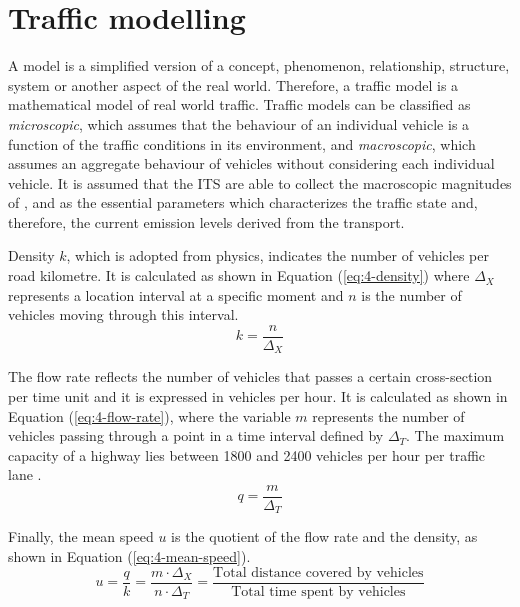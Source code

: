 \section{Traffic modelling}
A model is a simplified version of a concept, phenomenon, relationship, structure, system or another aspect of the real world. Therefore, a traffic model is a mathematical model of real world traffic. Traffic models can be classified as \textit{microscopic}, which assumes that the behaviour of an individual vehicle is a function of the traffic conditions in its environment, and \textit{macroscopic}, which assumes an aggregate behaviour of vehicles without considering each individual vehicle. It is assumed that the \ac{ITS} are able to collect the macroscopic magnitudes of ,  and  as the essential parameters which characterizes the traffic state and, therefore, the current emission levels derived from the transport.

Density $k$, which is adopted from physics, indicates the number of vehicles per road kilometre. It is calculated as shown in Equation (\ref{eq:4-density}) where ${ \Delta  }_{ X }$ represents a location interval at a specific moment and $n$ is the number of vehicles moving through this interval.
\begin{equation} \label{eq:4-density}
k = \frac { n }{ { \Delta  }_{ X } } 
\end{equation}

The flow rate reflects the number of vehicles that passes a certain cross-section per time unit and it is expressed in vehicles per hour. It is calculated as shown in Equation (\ref{eq:4-flow-rate}), where the variable $m$ represents the number of vehicles passing through a point in a time interval defined by ${ \Delta  }_{ T }$. The maximum capacity of a highway lies between 1800 and 2400 vehicles per hour per traffic lane \cite{HCM2000}.
\begin{equation} \label{eq:4-flow-rate}
q = \frac { m }{ { \Delta  }_{ T } } 
\end{equation}

Finally, the mean speed $u$ is the quotient of the flow rate and the density, as shown in Equation (\ref{eq:4-mean-speed}).
\begin{equation} \label{eq:4-mean-speed}
u = \frac { q }{ k } = \frac{m \cdot {\Delta  }_{ X }}{n \cdot {\Delta  }_{ T }} = \frac { \text{Total  distance  covered  by  vehicles} }{ \text{Total  time  spent  by  vehicles} } 
\end{equation}

